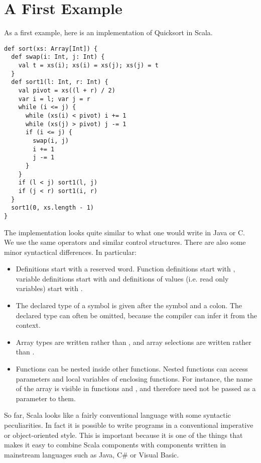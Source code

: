 \def\exercise{
   \def\theresult{Exercise~\thesection.\arabic{result}}
   \refstepcounter{result}
   \trivlist\item[\hskip
   \labelsep{\bf \theresult}]}
\def\endexercise{\endtrivlist}
 
\newcommand{\rewriteby}[1]{\mbox{\tab\tab\rm(#1)}}

\chapter{\label{chap:example-one}A First Example}

As a first example, here is an implementation of Quicksort in Scala.

\begin{lstlisting}
def sort(xs: Array[Int]) {
  def swap(i: Int, j: Int) {
    val t = xs(i); xs(i) = xs(j); xs(j) = t
  }
  def sort1(l: Int, r: Int) {
    val pivot = xs((l + r) / 2)
    var i = l; var j = r
    while (i <= j) {
      while (xs(i) < pivot) i += 1
      while (xs(j) > pivot) j -= 1
      if (i <= j) { 
        swap(i, j)
        i += 1
        j -= 1
      }
    } 
    if (l < j) sort1(l, j)
    if (j < r) sort1(i, r)
  }
  sort1(0, xs.length - 1)
}
\end{lstlisting}

The implementation looks quite similar to what one would write in Java
or C.  We use the same operators and similar control structures.
There are also some minor syntactical differences. In particular:
\begin{itemize}
\item
Definitions start with a reserved word. Function definitions start
with , variable definitions start with  and
definitions of values (i.e. read only variables) start with .
\item
The declared type of a symbol is given after the symbol and a colon.
The declared type can often be omitted, because the compiler can infer
it from the context.
\item
Array types are written  rather than , 
and array selections are written  rather than .
\item
Functions can be nested inside other functions. Nested functions can
access parameters and local variables of enclosing functions. For
instance, the name of the array  is visible in functions
 and , and therefore need not be passed as a
parameter to them.
\end{itemize}
So far, Scala looks like a fairly conventional language with some
syntactic peculiarities. In fact it is possible to write programs in a
conventional imperative or object-oriented style. This is important
because it is one of the things that makes it easy to combine Scala
components with components written in mainstream languages such as
Java, C\# or Visual Basic.

